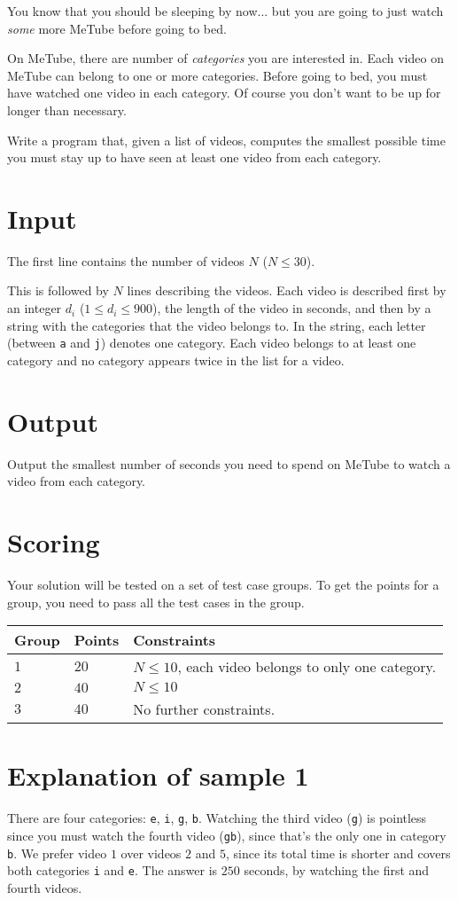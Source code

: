 You know that you should be sleeping by now... but you are going to just watch \emph{some} more MeTube before going to bed.

On MeTube, there are number of \emph{categories} you are interested in.
Each video on MeTube can belong to one or more categories.
Before going to bed, you must have watched one video in each category.
Of course you don't want to be up for longer than necessary.

Write a program that, given a list of videos, computes the smallest possible time you must stay up to have seen at least one video from each category.

\section*{Input}
The first line contains the number of videos $N$ ($N \le 30$).

This is followed by $N$ lines describing the videos.
Each video is described first by an integer $d_i$ ($1 \le d_i \le 900$), the length of the video in seconds, and then by a string with the categories that the video belongs to.
In the string, each letter (between \texttt{a} and \texttt{j}) denotes one category.
Each video belongs to at least one category and no category appears twice in the list for a video.

\section*{Output}
Output the smallest number of seconds you need to spend on MeTube to watch a video from each category.

\section*{Scoring}
Your solution will be tested on a set of test case groups.
To get the points for a group, you need to pass all the test cases in the group.

\noindent
\begin{tabular}{| l | l | p{10cm} |}
\hline
Group & Points & Constraints \\ \hline
  $1$    & $20$        & $N \le 10$, each video belongs to only one category. \\ \hline 
  $2$    & $40$        & $N \le 10$ \\ \hline
  $3$    & $40$        & No further constraints. \\ \hline 
\end{tabular}

\section*{Explanation of sample 1}
There are four categories: \texttt e, \texttt i, \texttt g, \texttt b.
Watching the third video (\texttt{g}) is pointless since you must watch the fourth video (\texttt{gb}), since that's the only one in category \texttt{b}.
We prefer video $1$ over videos $2$ and $5$, since its total time is shorter and covers both categories \texttt{i} and \texttt{e}.
The answer is $250$ seconds, by watching the first and fourth videos.

